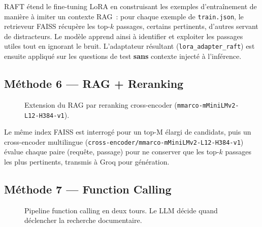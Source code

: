 \documentclass[10pt,journal,compsoc]{IEEEtran}
\begin{document}
RAFT étend le fine-tuning LoRA en construisant les exemples
d'entraînement de manière à imiter un contexte RAG~: pour chaque
exemple de \texttt{train.json}, le retrieveur FAISS récupère les
top-$k$ passages, certains pertinents, d'autres servant de distracteurs.
Le modèle apprend ainsi à identifier et exploiter les passages utiles
tout en ignorant le bruit. L'adaptateur résultant
(\texttt{lora\_adapter\_raft}) est ensuite appliqué sur les questions
de test \textbf{sans} contexte injecté à l'inférence.

\subsection{Méthode 6 --- RAG + Reranking}

\begin{figure}[H]
  \centering
  \caption{Extension du RAG par reranking cross-encoder
           (\texttt{mmarco-mMiniLMv2-L12-H384-v1}).}
  \label{fig:rerank}
\end{figure}

Le même index FAISS est interrogé pour un top-M élargi de candidats,
puis un cross-encoder multilingue
(\texttt{cross-encoder/mmarco-mMiniLMv2-L12-H384-v1}) évalue chaque
paire (requête, passage) pour ne conserver que les top-$k$ passages
les plus pertinents, transmis à Groq pour génération.

\subsection{Méthode 7 --- Function Calling}

\begin{figure}[H]
  \centering
  \caption{Pipeline function calling en deux tours. Le LLM décide
           quand déclencher la recherche documentaire.}
  \label{fig:fc}
\end{figure}
\end{document}
